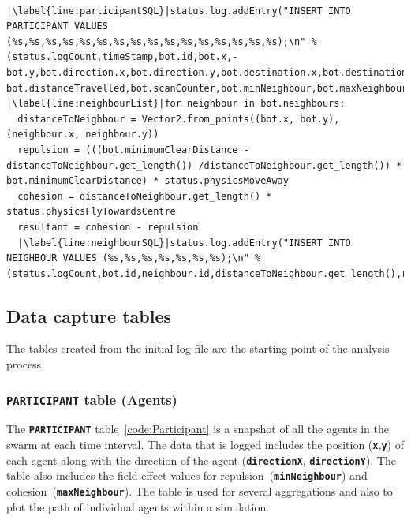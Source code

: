 \lstset{language=Python,
basicstyle=\tiny,
numbers=left, 
numberstyle=\tiny,
captionpos=b,
keepspaces=true,
showspaces=false, 
showstringspaces=false,
showtabs=false,
frame=single,
breaklines=true,
caption=Simulator data capture,
escapechar=|
} %
\begin{lstlisting}[label={code:SQL2}]  % Start your code-block

|\label{line:participantSQL}|status.log.addEntry("INSERT INTO PARTICIPANT VALUES (%s,%s,%s,%s,%s,%s,%s,%s,%s,%s,%s,%s,%s,%s,%s,%s);\n" % (status.logCount,timeStamp,bot.id,bot.x,-bot.y,bot.direction.x,bot.direction.y,bot.destination.x,bot.destination.y,bot.alive, bot.distanceTravelled,bot.scanCounter,bot.minNeighbour,bot.maxNeighbour,bot.isPerimeter,bot.scanning))
|\label{line:neighbourList}|for neighbour in bot.neighbours:
  distanceToNeighbour = Vector2.from_points((bot.x, bot.y),(neighbour.x, neighbour.y))
  repulsion = (((bot.minimumClearDistance - distanceToNeighbour.get_length()) /distanceToNeighbour.get_length()) * bot.minimumClearDistance) * status.physicsMoveAway
  cohesion = distanceToNeighbour.get_length() * status.physicsFlyTowardsCentre
  resultant = cohesion - repulsion
  |\label{line:neighbourSQL}|status.log.addEntry("INSERT INTO NEIGHBOUR VALUES (%s,%s,%s,%s,%s,%s,%s);\n" % (status.logCount,bot.id,neighbour.id,distanceToNeighbour.get_length(),resultant,cohesion,repulsion))
\end{lstlisting}

\subsection{Data capture tables}
The tables created from the initial log file are the starting point of the analysis process. 

\subsubsection{\texttt{\textbf{PARTICIPANT}} table (Agents)}
The \texttt{\textbf{PARTICIPANT}} table~\ref{code:Participant} is a snapshot of all the agents in the swarm at each time interval. The data that is logged includes the position (\texttt{\textbf{x}},\texttt{\textbf{y}}) of each agent along with the direction of the agent (\texttt{\textbf{directionX}}, \texttt{\textbf{directionY}}). The table also includes the field effect values for repulsion~(\texttt{\textbf{minNeighbour}}) and cohesion~(\texttt{\textbf{maxNeighbour}}). The table is used for several aggregations and also to plot the path of individual agents within a simulation.

